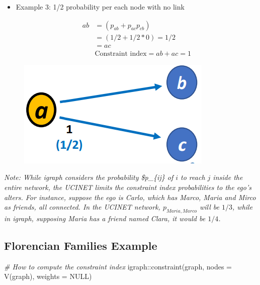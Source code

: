 \documentclass[
  notitlepage,
  onecolumn,
  openany]{book}
\newenvironment{Shaded}{\begin{snugshade}}{\end{snugshade}}
\newcommand{\AttributeTok}[1]{\textcolor[rgb]{0.77,0.63,0.00}{#1}}
\newcommand{\CommentTok}[1]{\textcolor[rgb]{0.56,0.35,0.01}{\textit{#1}}}
\newcommand{\ConstantTok}[1]{\textcolor[rgb]{0.00,0.00,0.00}{#1}}
\newcommand{\FunctionTok}[1]{\textcolor[rgb]{0.00,0.00,0.00}{#1}}
\newcommand{\NormalTok}[1]{#1}
\newcommand{\SpecialCharTok}[1]{\textcolor[rgb]{0.00,0.00,0.00}{#1}}
\begin{document}
\begin{itemize}
\item
  Example 3: 1/2 probability per each node with no link

  \[
    \begin{aligned}
    ab &= (p_{ab}+p_{ac}p_{cb})
    \\&= (1/2+1/2*0)=1/2\\
    & = ac\\
    &\text{Constraint index} = ab+ac= 1
    \end{aligned}
    \]
\end{itemize}

\begin{figure}[h!]

{\centering \includegraphics[width=0.4\linewidth]{images/08-Metrics for structural holes/Untitled 3} 

}

\end{figure}

\emph{Note: While igraph considers the probability \$p\_\{ij\} of \(i\) to reach \(j\) inside the entire network, the UCINET limits the constraint index probabilities to the ego's alters. For instance, suppose the ego is Carlo, which has Marco, Maria and Mirco as friends, all connected. In the UCINET network, \(p_{Maria, Marco}\) will be \(1/3\), while in igraph, supposing Maria has a friend named Clara, it would be \(1/4\).}

\hypertarget{florencian-families-example}{%
\subsection{Florencian Families Example}\label{florencian-families-example}}

\begin{Shaded}
\begin{Highlighting}[]
\CommentTok{\# How to compute the constraint index}
\NormalTok{igraph}\SpecialCharTok{::}\FunctionTok{constraint}\NormalTok{(graph, }\AttributeTok{nodes =} \FunctionTok{V}\NormalTok{(graph), }\AttributeTok{weights =} \ConstantTok{NULL}\NormalTok{)}
\end{Highlighting}
\end{Shaded}
\end{document}
